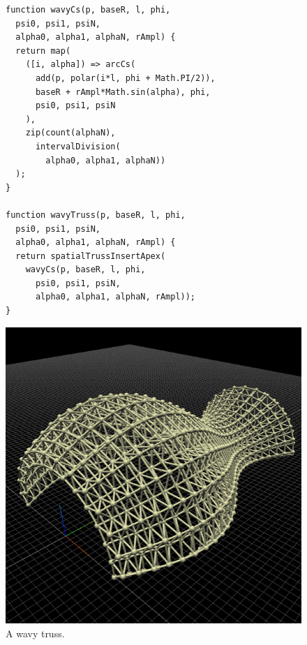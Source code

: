 \begin{figure}
\begin{minipage}{0.5\textwidth}
\begin{verbatim}
function wavyCs(p, baseR, l, phi,
  psi0, psi1, psiN,
  alpha0, alpha1, alphaN, rAmpl) {
  return map(
    ([i, alpha]) => arcCs(
      add(p, polar(i*l, phi + Math.PI/2)),
      baseR + rAmpl*Math.sin(alpha), phi,
      psi0, psi1, psiN
    ),
    zip(count(alphaN),
      intervalDivision(
        alpha0, alpha1, alphaN))
  );
}

function wavyTruss(p, baseR, l, phi,
  psi0, psi1, psiN,
  alpha0, alpha1, alphaN, rAmpl) {
  return spatialTrussInsertApex(
    wavyCs(p, baseR, l, phi,
      psi0, psi1, psiN,
      alpha0, alpha1, alphaN, rAmpl));
}
\end{verbatim}
\end{minipage}%
\begin{minipage}{0.5\textwidth}
  \includegraphics[width=1.0\textwidth]{./images/detail_examples/wavy_truss_crop}
\end{minipage}
\caption{A wavy truss.}
\label{fig:truss:wavy}
\end{figure}

